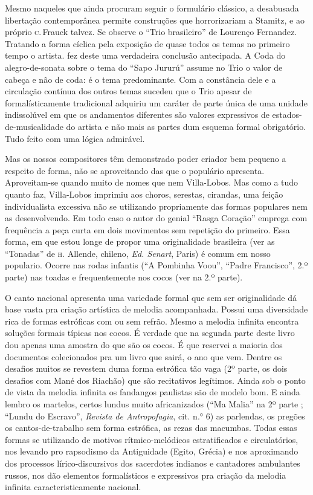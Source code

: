 Mesmo naqueles que ainda procuram seguir o formulário clássico, a
desabusada libertação contemporânea permite construções que
horrorizariam a Stamitz, e ao próprio \textsc{c}.\,Frauck talvez. Se observe o
``Trio brasileiro'' de Lourenço Fernandez. Tratando a forma cíclica pela
exposição de quase todos os temas no primeiro tempo o artista. fez deste
uma verdadeira conclusão antecipada. A Coda do alegro-de-sonata sobre o
tema do ``Sapo Jururú'' assume no Trio o valor de cabeça e não de coda: é
o tema predominante. Com a constância dele e a circulação contínua dos
outros temas sucedeu que o Trio apesar de formalísticamente tradicional
adquiriu um caráter de parte única de uma unidade indissolúvel em que os
andamentos diferentes são valores expressivos de estados-de-musicalidade
do artista e não mais as partes dum esquema formal obrigatório. Tudo
feito com uma lógica admirável.

Mas os nossos compositores têm demonstrado poder criador bem pequeno a
respeito de forma, não se aproveitando das que o populário apresenta.
Aproveitam-se quando muito de nomes que nem Villa-Lobos. Mas como a tudo
quanto faz, Villa-Lobos imprimiu aos choros, serestas, cirandas, uma
feição individualista excessiva não se utilizando propriamente das
formas populares nem as desenvolvendo. Em todo caso o autor do genial
``Rasga Coração'' emprega com frequência a peça curta em dois movimentos
sem repetição do primeiro. Essa forma, em que estou longe de propor uma
originalidade brasileira (ver as ``Tonadas'' de \textsc{h}. Allende, chileno, \textit{Ed.
Senart}, Paris) é comum em nosso populario. Ocorre nas rodas infantis (``A
Pombinha Voou'', ``Padre Francisco'', 2.º parte) nas toadas e
frequentemente nos cocos (ver na 2.º parte).

O canto nacional apresenta uma variedade formal que sem ser
originalidade dá base vasta pra criação artística de melodia
acompanhada. Possui uma diversidade rica de formas estróficas com ou sem
refrão. Mesmo a melodia infinita encontra soluções formais típicas nos
cocos. É verdade que na segunda parte deste livro dou apenas uma amostra
do que são os cocos. É que reservei a maioria dos documentos
colecionados pra um livro que sairá, o ano que vem. Dentre os desafios
muitos se revestem duma forma estrófica tão vaga (2º parte, os dois
desafios com Mané dos Riachão) que são recitativos legítimos. Ainda sob
o ponto de vista da melodia infinita os fandangos paulistas são de
modelo bom. E ainda lembro os martelos, certos lundus muito
africanizados (``Ma Malia'' na 2º parte ; ``Lundu do Escravo'', \textit{Revista de
Antropofagia}, cit. n.° 6) as parlendas, os pregões os cantos-de-trabalho
sem forma estrófica, as rezas das macumbas. Todas essas formas se
utilizando de motivos rítmico-melódicos estratificados e circulatórios,
nos levando pro rapsodismo da Antiguidade (Egito, Grécia) e nos
aproximando dos processos lírico-discursivos dos sacerdotes indianos e
cantadores ambulantes russos, nos dão elementos formalísticos e
expressivos pra criação da melodia infinita caracteristicamente
nacional.


